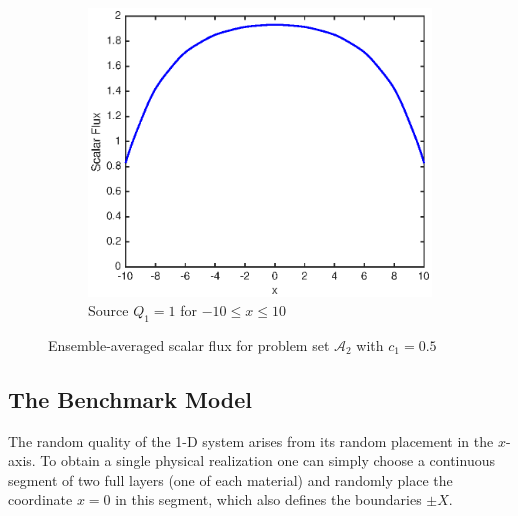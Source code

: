 \documentclass[12pt]{article}
\newcommand{\seta}{\mathcal{A}}
\begin{document}
{\begin{figure}[hbt]
\begin{subfigure}{0.495\textwidth}
    \end{subfigure}
    \hfill
    \begin{subfigure}{0.495\textwidth}
        \centering
        \includegraphics[width=\textwidth]{fig3b.eps}
        \caption{Source $Q_1=1$ for $-10\leq x\leq 10$}
        \label{fig3b}
    \end{subfigure}
    \caption{Ensemble-averaged scalar flux for problem set {$\seta_2$} with $c_1=0.5$}
    \label{fig3}
\end{figure}



\subsection{The Benchmark Model}

The random quality of the 1-D system arises from its random placement in the $x$-axis.
To obtain a single physical realization one can simply choose a continuous segment of two full layers (one of each material) and randomly place the coordinate $x=0$ in this segment, which also defines the boundaries $\pm X$.

}
\end{document}
